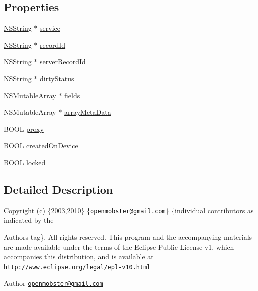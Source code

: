 \subsection*{\-Properties}
\begin{DoxyCompactItemize}
\item 
\hyperlink{class_n_s_string}{\-N\-S\-String} $\ast$ \hyperlink{interface_mobile_object_a950d75e8dc01d8654303c70e3c88277f}{service}
\item 
\hyperlink{class_n_s_string}{\-N\-S\-String} $\ast$ \hyperlink{interface_mobile_object_a8cf6b29f1c6e116c7bc35c1eb4ae74a8}{record\-Id}
\item 
\hyperlink{class_n_s_string}{\-N\-S\-String} $\ast$ \hyperlink{interface_mobile_object_ac4bfacd12f90050641a01aa9e7c3936d}{server\-Record\-Id}
\item 
\hyperlink{class_n_s_string}{\-N\-S\-String} $\ast$ \hyperlink{interface_mobile_object_aed14ad8d9bfeec4abf208382d5d993f7}{dirty\-Status}
\item 
\-N\-S\-Mutable\-Array $\ast$ \hyperlink{interface_mobile_object_a3f6034888e7e577308b56bfe68ca7d8a}{fields}
\item 
\-N\-S\-Mutable\-Array $\ast$ \hyperlink{interface_mobile_object_a03fea1a4cfbbb24733c3241e9108bdae}{array\-Meta\-Data}
\item 
\-B\-O\-O\-L \hyperlink{interface_mobile_object_a14bc6bd129264f6292f992aad3d81001}{proxy}
\item 
\-B\-O\-O\-L \hyperlink{interface_mobile_object_ac4db5b3450726a981ad660ce82497189}{created\-On\-Device}
\item 
\-B\-O\-O\-L \hyperlink{interface_mobile_object_ac70f026571a39b77c0a4e5f37ff9b8e7}{locked}
\end{DoxyCompactItemize}


\subsection{\-Detailed \-Description}
\-Copyright (c) \{2003,2010\} \{\href{mailto:openmobster@gmail.com}{\tt openmobster@gmail.\-com}\} \{individual contributors as indicated by the \begin{DoxyAuthor}{\-Authors}
tag\}. \-All rights reserved. \-This program and the accompanying materials are made available under the terms of the \-Eclipse \-Public \-License v1. which accompanies this distribution, and is available at \href{http://www.eclipse.org/legal/epl-v10.html}{\tt http\-://www.\-eclipse.\-org/legal/epl-\/v10.\-html}
\end{DoxyAuthor}
\begin{DoxyAuthor}{\-Author}
\href{mailto:openmobster@gmail.com}{\tt openmobster@gmail.\-com} 
\end{DoxyAuthor}


